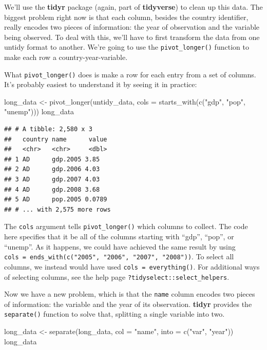 \documentclass[
  12pt,
  oneside,openany]{book}
\newenvironment{Shaded}{\begin{snugshade}}{\end{snugshade}}
\newcommand{\AttributeTok}[1]{\textcolor[rgb]{0.77,0.63,0.00}{#1}}
\newcommand{\FunctionTok}[1]{\textcolor[rgb]{0.00,0.00,0.00}{#1}}
\newcommand{\NormalTok}[1]{#1}
\newcommand{\OtherTok}[1]{\textcolor[rgb]{0.56,0.35,0.01}{#1}}
\newcommand{\StringTok}[1]{\textcolor[rgb]{0.31,0.60,0.02}{#1}}
\begin{document}
We'll use the \textbf{tidyr} package (again, part of \textbf{tidyverse}) to clean up this data. The biggest problem right now is that each column, besides the country identifier, really encodes two pieces of information: the year of observation and the variable being observed. To deal with this, we'll have to first transform the data from one untidy format to another. We're going to use the \texttt{pivot\_longer()} function to make each row a country-year-variable.

What \texttt{pivot\_longer()} does is make a row for each entry from a set of columns. It's probably easiest to understand it by seeing it in practice:

\begin{Shaded}
\begin{Highlighting}[]
\NormalTok{long\_data }\OtherTok{\textless{}{-}} \FunctionTok{pivot\_longer}\NormalTok{(untidy\_data,}
                          \AttributeTok{cols =} \FunctionTok{starts\_with}\NormalTok{(}\FunctionTok{c}\NormalTok{(}\StringTok{"gdp"}\NormalTok{, }\StringTok{"pop"}\NormalTok{, }\StringTok{"unemp"}\NormalTok{)))}
\NormalTok{long\_data}
\end{Highlighting}
\end{Shaded}

\begin{verbatim}
## # A tibble: 2,580 x 3
##   country name      value
##   <chr>   <chr>     <dbl>
## 1 AD      gdp.2005 3.85  
## 2 AD      gdp.2006 4.03  
## 3 AD      gdp.2007 4.03  
## 4 AD      gdp.2008 3.68  
## 5 AD      pop.2005 0.0789
## # ... with 2,575 more rows
\end{verbatim}

The \texttt{cols} argument tells \texttt{pivot\_longer()} which columns to collect.
The code here specifies that it be all of the columns starting with ``gdp'', ``pop'', or ``unemp''.
As it happens, we could have achieved the same result by using \texttt{cols\ =\ ends\_with(c("2005",\ "2006",\ "2007",\ "2008"))}.
To select all columns, we instead would have used \texttt{cols\ =\ everything()}.
For additional ways of selecting columns, see the help page \texttt{?tidyselect::select\_helpers}.

Now we have a new problem, which is that the \texttt{name} column encodes two pieces of information: the variable and the year of its observation. \textbf{tidyr} provides the \texttt{separate()} function to solve that, splitting a single variable into two.

\begin{Shaded}
\begin{Highlighting}[]
\NormalTok{long\_data }\OtherTok{\textless{}{-}} \FunctionTok{separate}\NormalTok{(long\_data,}
                      \AttributeTok{col =} \StringTok{"name"}\NormalTok{,}
                      \AttributeTok{into =} \FunctionTok{c}\NormalTok{(}\StringTok{"var"}\NormalTok{, }\StringTok{"year"}\NormalTok{))}
\NormalTok{long\_data}
\end{Highlighting}
\end{Shaded}
\end{document}
